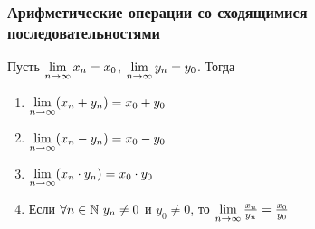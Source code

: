 \subsubsection{Арифметические операции со сходящимися последовательностями}

Пусть $\lim\limits_{n \to \infty} x_n = x_0$, $\lim\limits_{n \to \infty} y_n = y_0$. Тогда

\begin{enumerate}
	\item $\lim\limits_{n \to \infty} (x_n + y_n) = x_0 + y_0$
	\item $\lim\limits_{n \to \infty} (x_n - y_n) = x_0 - y_0$
	\item $\lim\limits_{n \to \infty} (x_n \cdot y_n) = x_0 \cdot y_0$
	\item Если $\forall n \in \mathbb{N}\ y_n \neq 0$ и $y_0 \neq 0$, то $\lim\limits_{n \to \infty} \frac{x_n}{y_n} = \frac{x_0}{y_0}$
\end{enumerate}

